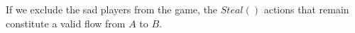 \begin{proofsketch}
   If we exclude the sad players from the game, the $Steal\left(\right)$ actions that remain constitute a valid flow from
   $A$ to $B$.
\end{proofsketch}

